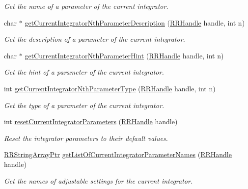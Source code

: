 \begin{DoxyCompactItemize}
\begin{DoxyCompactList}\small\item\em Get the name of a parameter of the current integrator. \end{DoxyCompactList}\item 
char $\ast$ \hyperlink{group__simopts_ga2e525f711d43789ec1170f043f86f127}{get\+Current\+Integrator\+Nth\+Parameter\+Description} (\hyperlink{rrc__types_8h_a1d68f0592372208fa5a5f2799ea4b3ae}{R\+R\+Handle} handle, int n)
\begin{DoxyCompactList}\small\item\em Get the description of a parameter of the current integrator. \end{DoxyCompactList}\item 
char $\ast$ \hyperlink{group__simopts_gafa723d0091d673126b4330ec9d6dca11}{get\+Current\+Integrator\+Nth\+Parameter\+Hint} (\hyperlink{rrc__types_8h_a1d68f0592372208fa5a5f2799ea4b3ae}{R\+R\+Handle} handle, int n)
\begin{DoxyCompactList}\small\item\em Get the hint of a parameter of the current integrator. \end{DoxyCompactList}\item 
int \hyperlink{group__simopts_ga0d54a5567d45d3f0547fecbaeae86dd7}{get\+Current\+Integrator\+Nth\+Parameter\+Type} (\hyperlink{rrc__types_8h_a1d68f0592372208fa5a5f2799ea4b3ae}{R\+R\+Handle} handle, int n)
\begin{DoxyCompactList}\small\item\em Get the type of a parameter of the current integrator. \end{DoxyCompactList}\item 
int \hyperlink{group__simopts_gaefa42b6e122d13988bde99fcf6e050d6}{reset\+Current\+Integrator\+Parameters} (\hyperlink{rrc__types_8h_a1d68f0592372208fa5a5f2799ea4b3ae}{R\+R\+Handle} handle)
\begin{DoxyCompactList}\small\item\em Reset the integrator parameters to their default values. \end{DoxyCompactList}\item 
\hyperlink{rrc__types_8h_a7c9475df6c7337d99482b13a365e7596}{R\+R\+String\+Array\+Ptr} \hyperlink{group__simopts_ga8bc1ea6950f141d40373416d64abaefa}{get\+List\+Of\+Current\+Integrator\+Parameter\+Names} (\hyperlink{rrc__types_8h_a1d68f0592372208fa5a5f2799ea4b3ae}{R\+R\+Handle} handle)
\begin{DoxyCompactList}\small\item\em Get the names of adjustable settings for the current integrator. \end{DoxyCompactList}\item 

\end{DoxyCompactItemize}
